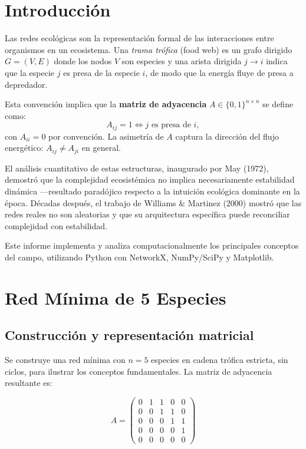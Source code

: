 \documentclass[12pt, a4paper]{article}
\begin{document}
\section{Introducción}

Las redes ecológicas son la representación formal de las interacciones entre organismos
en un ecosistema. Una \textit{trama trófica} (food web) es un grafo dirigido
$G = (V, E)$ donde los nodos $V$ son especies y una arista dirigida $j \to i$ indica que
la especie $j$ es presa de la especie $i$, de modo que la energía fluye de presa a
depredador.

Esta convención implica que la \textbf{matriz de adyacencia} $A \in \{0,1\}^{n\times n}$
se define como:
\begin{equation}
    A_{ij} = 1 \iff j \text{ es presa de } i,
    \label{eq:adj}
\end{equation}
con $A_{ii} = 0$ por convención. La asimetría de $A$ captura la dirección del flujo
energético: $A_{ij} \neq A_{ji}$ en general.

El análisis cuantitativo de estas estructuras, inaugurado por May (1972), demostró que
la complejidad ecosistémica no implica necesariamente estabilidad dinámica —resultado
paradójico respecto a la intuición ecológica dominante en la época. Décadas después,
el trabajo de Williams \& Martinez (2000) mostró que las redes reales no son aleatorias
y que su arquitectura específica puede reconciliar complejidad con estabilidad.

Este informe implementa y analiza computacionalmente los principales conceptos del
campo, utilizando Python con NetworkX, NumPy/SciPy y Matplotlib.

\section{Red Mínima de 5 Especies}

\subsection{Construcción y representación matricial}

Se construye una red mínima con $n = 5$ especies en cadena trófica estricta, sin ciclos,
para ilustrar los conceptos fundamentales. La matriz de adyacencia resultante es:

\begin{equation}
A = \begin{pmatrix}
0 & 1 & 1 & 0 & 0 \\
0 & 0 & 1 & 1 & 0 \\
0 & 0 & 0 & 1 & 1 \\
0 & 0 & 0 & 0 & 1 \\
0 & 0 & 0 & 0 & 0
\end{pmatrix}
\label{eq:A5}
\end{equation}
\end{document}
